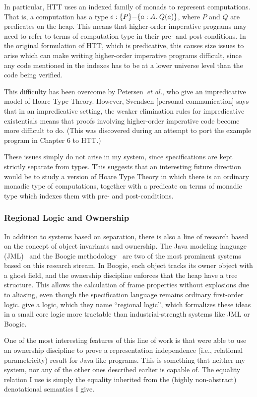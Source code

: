 In particular, HTT uses an indexed family of monads to represent
computations.  That is, a computation has a type $e :
\{{P}\}{-}\{{a:A}.\;{Q(a)}\}$, where $P$ and $Q$ are predicates on the
heap. This means that higher-order imperative programs may need to
refer to terms of computation type in their pre- and post-conditions.
In the original formulation of HTT, which is predicative, this causes
size issues to arise which can make writing higher-order imperative
programs difficult, since any code mentioned in the indexes has to be
at a lower universe level than the code being verified.

This difficulty has been overcome by Petersen~\emph{et al.}, who give
an impredicative model of Hoare Type Theory. However, Svendsen
[personal communication] says that in an impredicative setting, the
weaker elimination rules for impredicative existentials means that
proofs involving higher-order imperative code become more difficult to
do. (This was discovered during an attempt to port the example program
in Chapter 6 to HTT.)

These issues simply do not arise in my system, since specifications
are kept strictly separate from types. This suggests that an
interesting future direction would be to study a version of Hoare Type
Theory in which there is an ordinary monadic type of computations,
together with a predicate on terms of monadic type which indexes them
with pre- and post-conditions.

\subsubsection{Regional Logic and Ownership}

In addition to systems based on separation, there is also a line of
research based on the concept of object invariants and ownership.  The
Java modeling language (JML)~\cite{jml} and the Boogie
methodology~\cite{boogie} are two of the most prominent systems based
on this research stream. In Boogie, each object tracks its owner
object with a ghost field, and the ownership discipline enforces that
the heap have a tree structure. This allows the calculation of frame
properties without explosions due to aliasing, even though the
specification language remains ordinary first-order
logic. \citet{banerjee-naumann-regions} give a logic, which they name
``regional logic'', which formalizes these ideas in a small core logic
more tractable than industrial-strength systems like JML or Boogie.

One of the most interesting features of this line of work is that
\citet{banerjee-naumann-rep} were able to use an ownership discipline to
prove a representation independence (i.e., relational parametricity)
result for Java-like programs.  This is something that neither my
system, nor any of the other ones described earlier is capable of.
The equality relation I use is simply the equality inherited from the
(highly non-abstract) denotational semantics I give.


